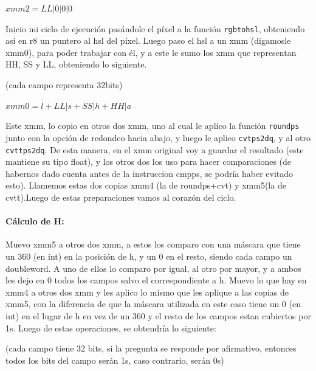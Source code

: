 \documentclass[a4paper]{article}
\begin{document}
$xmm2=LL|0|0|0$

\vspace*{0.3cm}

Inicio mi ciclo de ejecución pasándole el píxel a la función {\tt rgbtohsl}, obteniendo así en r8 un puntero al hsl del píxel. Luego paso el hsl a un xmm (digamosle xmm0), para poder trabajar con él, y a este le sumo los xmm que representan HH, SS y LL, obteniendo lo siguiente.

(cada campo representa 32bits)

\vspace*{0.3cm}

$xmm0=l+LL|s+SS|h+HH|a$

\vspace*{0.3cm}

Este xmm, lo copio en otros dos xmm, uno al cual le aplico la función {\tt roundps} junto con la opción de redondeo hacia abajo, y luego le aplico {\tt cvtps2dq}, y al otro {\tt cvttps2dq}. De esta manera, en el xmm original voy a guardar el resultado (este mantiene su tipo float), y los otros dos los uso para hacer comparaciones (de habernos dado cuenta antes de la instruccion cmpps, se podría haber evitado esto). Llamemos estas dos copias xmm4 (la de roundps+cvt) y xmm5(la de cvtt).Luego de estas preparaciones vamos al corazón del ciclo.

\paragraph*{Cálculo de H:}

Muevo xmm5 a otros dos xmm, a estos los comparo con una máscara que tiene un 360 (en int) en la posición de h, y un 0 en el resto, siendo cada campo un doubleword. A uno de ellos lo comparo por igual, al otro por mayor, y a ambos les dejo en 0 todos los campos salvo el correspondiente a h. Muevo lo que hay en xmm4 a otros dos xmm y les aplico lo mismo que les aplique a las copias de xmm5, con la diferencia de que la máscara utilizada en este caso tiene un 0 (en int) en el lugar de h en vez de un 360 y el resto de los campos estan cubiertos por 1s. Luego de estas operaciones, se obtendría lo siguiente:

\vspace*{0.3cm}

(cada campo tiene 32 bits, si la pregunta se responde por afirmativo, entonces todos los bits del campo serán 1s, caso contrario, serán 0s)

\vspace*{0.3cm}
\end{document}
